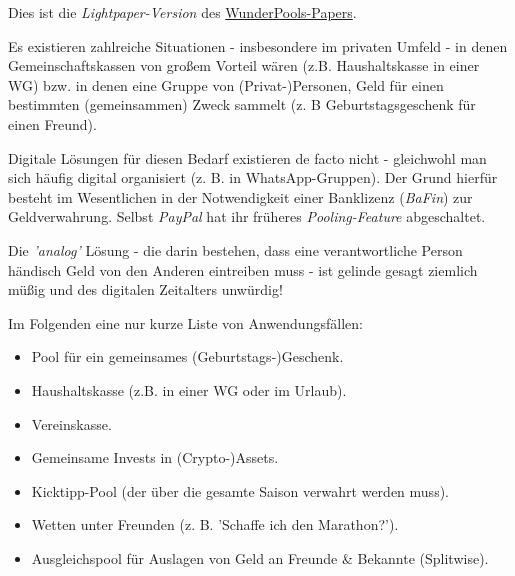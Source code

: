 
Dies ist die \textit{Lightpaper-Version} des \href{https://github.com/WunderPass/White-Paper/blob/main/pools.pdf}{WunderPools-Papers}.

\vspace{0.3cm}


\begin{Problem*}

Es existieren zahlreiche Situationen - insbesondere im privaten Umfeld - in denen Gemeinschaftskassen von großem Vorteil wären (z.B. Haushaltskasse in einer WG) bzw. in denen eine Gruppe von (Privat-)Personen, Geld für einen bestimmten (gemeinsammen) Zweck sammelt (z. B Geburtstagsgeschenk für einen Freund).

\vspace{0.3cm}

Digitale Lösungen für diesen Bedarf existieren de facto nicht - gleichwohl man sich häufig digital organisiert (z. B. in WhatsApp-Gruppen). Der Grund hierfür besteht im Wesentlichen in der Notwendigkeit einer Banklizenz (\textit{BaFin}) zur Geldverwahrung. Selbst \textit{PayPal} hat ihr früheres \textit{Pooling-Feature} abgeschaltet.

\vspace{0.1cm}

Die \textit{'analog'} Lösung - die darin bestehen, dass eine verantwortliche Person händisch Geld von den Anderen eintreiben muss - ist gelinde gesagt ziemlich müßig und des digitalen Zeitalters unwürdig! 

\end{Problem*}

\vspace{0.3cm}


\begin{Example*}

Im Folgenden eine nur kurze Liste von Anwendungsfällen:

\begin{itemize}
  \item Pool für ein gemeinsames (Geburtstags-)Geschenk.
  \item Haushaltskasse (z.B. in einer WG oder im Urlaub).
  \item Vereinskasse.
  \item Gemeinsame Invests in (Crypto-)Assets.
  \item Kicktipp-Pool (der über die gesamte Saison verwahrt werden muss).
  \item Wetten unter Freunden (z. B. 'Schaffe ich den Marathon?').
  \item Ausgleichspool für Auslagen von Geld an Freunde \& Bekannte (Splitwise).
\end{itemize}

\end{Example*}

